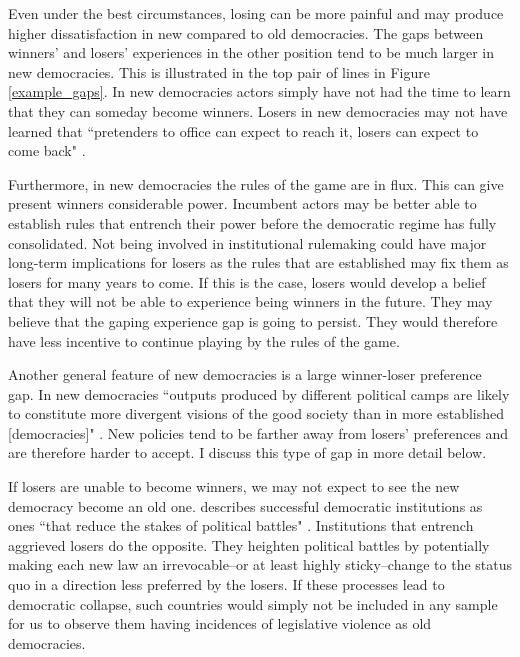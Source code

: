 \documentclass[a4paper]{article}\usepackage{graphicx, color}
\begin{document}
{Even under the best circumstances, losing can be more painful and may produce higher dissatisfaction in new compared to old democracies. The gaps between winners' and losers' experiences in the other position tend to be much larger in new democracies. This is illustrated in the top pair of lines in Figure \ref{example_gaps}. In new democracies actors simply have not had the time to learn that they can someday become winners. Losers in new democracies may not have learned that ``pretenders to office can expect to reach it, losers can expect to come back" \citep[][36]{Przeworski1991}.

Furthermore, in new democracies the rules of the game are in flux. This can give present winners considerable power. Incumbent actors may be better able to establish rules that entrench their power before the democratic regime has fully consolidated. Not being involved in institutional rulemaking could have major long-term implications for losers as the rules that are established may fix them as losers for many years to come. If this is the case, losers would develop a belief that they will not be able to experience being winners in the future. They may believe that the gaping experience gap is going to persist. They would therefore have less incentive to continue playing by the rules of the game. 

Another general feature of new democracies is a large winner-loser preference gap. In new democracies ``outputs produced by different political camps are likely to constitute more divergent visions of the good society than in more established [democracies]" \citep[][92]{Anderson2005}. New policies tend to be farther away from losers' preferences and are therefore harder to accept. I discuss this type of gap in more detail below.

If losers are unable to become winners, we may not expect to see the new democracy become an old one. \citeauthor{Przeworski1991} describes successful democratic institutions as ones ``that reduce the stakes of political battles" \citeyearpar[][36]{Przeworski1991}. Institutions that entrench aggrieved losers do the opposite. They heighten political battles by potentially making each new law an irrevocable--or at least highly sticky--change to the status quo in a direction less preferred by the losers. If these processes lead to democratic collapse, such countries would simply not be included in any sample for us to observe them having incidences of legislative violence as old democracies. 

\begin{center}


\end{center}}
\end{document}
